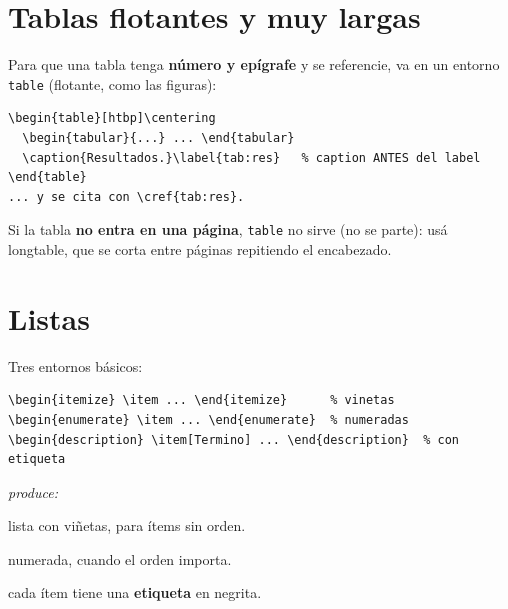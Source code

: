 \documentclass[11pt,a4paper]{article}
\newcommand{\pkg}[1]{\textsf{#1}}
\newcommand{\produce}{\par\smallskip\noindent\textit{produce:}\par\smallskip}
\begin{document}
\section{Tablas flotantes y muy largas}
Para que una tabla tenga \textbf{número y epígrafe} y se referencie, va en un
entorno \texttt{table} (flotante, como las figuras):
\begin{lstlisting}
\begin{table}[htbp]\centering
  \begin{tabular}{...} ... \end{tabular}
  \caption{Resultados.}\label{tab:res}   % caption ANTES del label
\end{table}
... y se cita con \cref{tab:res}.
\end{lstlisting}
Si la tabla \textbf{no entra en una página}, \texttt{table} no sirve (no se
parte): usá \pkg{longtable}, que se corta entre páginas repitiendo el encabezado.

\section{Listas}
Tres entornos básicos:
\begin{lstlisting}
\begin{itemize} \item ... \end{itemize}      % vinetas
\begin{enumerate} \item ... \end{enumerate}  % numeradas
\begin{description} \item[Termino] ... \end{description}  % con etiqueta
\end{lstlisting}
\produce
\begin{center}\begin{minipage}{0.85\linewidth}
\begin{description}[leftmargin=2.2cm,style=nextline,font=\bfseries]
  \item[itemize] lista con viñetas, para ítems sin orden.
  \item[enumerate] numerada, cuando el orden importa.
  \item[description] cada ítem tiene una \textbf{etiqueta} en negrita.
\end{description}
\end{minipage}\end{center}
\end{document}
